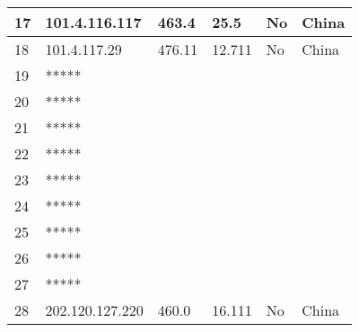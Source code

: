 \begin{center}
\begin{tabular}{| l | l | l | l | l | l | }
   17      & 101.4.116.117  & 463.4  & 25.5   & No      & China          \\ \hline
   18      & 101.4.117.29   & 476.11 & 12.711 & No      & China          \\ \hline
   19      & *****          &        &        &         &                \\ \hline
   20      & *****          &        &        &         &                \\ \hline
   21      & *****          &        &        &         &                \\ \hline
   22      & *****          &        &        &         &                \\ \hline
   23      & *****          &        &        &         &                \\ \hline
   24      & *****          &        &        &         &                \\ \hline
   25      & *****          &        &        &         &                \\ \hline
   26      & *****          &        &        &         &                \\ \hline
   27      & *****          &        &        &         &                \\ \hline
   28      & 202.120.127.220 & 460.0 & 16.111 & No      & China          \\ \hline
    \end{tabular}
\end{center}
